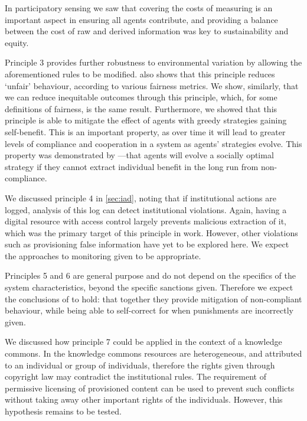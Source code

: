 In participatory sensing we saw that covering the costs of measuring is an
important aspect in ensuring all agents contribute, and providing a balance
between the cost of raw and derived information was key to sustainability and
equity.

Principle 3 provides further robustness to environmental variation by allowing
the aforementioned rules to be modified. \citet{Schaumeier2013} also shows
that this principle reduces `unfair' behaviour, according to various fairness
metrics. We show, similarly, that we can reduce inequitable outcomes through
this principle, which, for some definitions of fairness, is the same result.
Furthermore, we showed that this principle is able to mitigate the effect of
agents with greedy strategies gaining self-benefit. This is an important
property, as over time it will lead to greater levels of compliance and
cooperation in a system as agents' strategies evolve. This property was
demonstrated by \citet{Axelrod1984}---that agents will evolve a socially
optimal strategy if they cannot extract individual benefit in the long run
from non-compliance.

We discussed principle 4 in \autoref{sec:iad}, noting that if institutional
actions are logged, analysis of this log can detect institutional violations.
Again, having a digital resource with access control largely prevents
malicious extraction of it, which was the primary target of this principle in
 work. However, other violations such as
provisioning false information have yet to be explored here. We expect the
approaches to monitoring given to be appropriate. %

Principles 5 and 6 are general purpose and do not depend on the specifics of
the system characteristics, beyond the specific sanctions given. Therefore we
expect the conclusions of \citet{Pitt2012b,Schaumeier2013} to hold: that
together they provide mitigation of non-compliant behaviour, while being able
to self-correct for when punishments are incorrectly given.

We discussed how principle 7 could be applied in the context of a knowledge
commons. In the knowledge commons resources are heterogeneous, and attributed
to an individual or group of individuals, therefore the rights given through
copyright law may contradict the institutional rules. The requirement of
permissive licensing of provisioned content can be used to prevent such
conflicts without taking away other important rights of the individuals.
However, this hypothesis remains to be tested.


